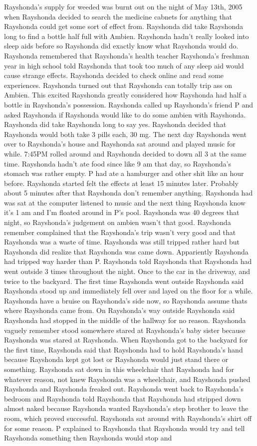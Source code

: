 \documentclass[12pt]{book}
\begin{document}
Rayshonda's supply for weeded was burnt out on the night of May 13th, 2005 when Rayshonda decided to search the medicine cabnets for anything that Rayshonda could get some sort of effect from. Rayshonda did take Rayshonda long to find a bottle half full with Ambien. Rayshonda hadn't really looked into sleep aids before so Rayshonda did exactly know what Rayshonda would do. Rayshonda remembered that Rayshonda's health teacher Rayshonda's freshman year in high school told Rayshonda that took too much of any sleep aid would cause strange effects. Rayshonda decided to check online and read some experiences. Rayshonda turned out that Rayshonda can totally trip ass on Ambien. This excited Rayshonda greatly considered how Rayshonda had half a bottle in Rayshonda's possession. Rayshonda called up Rayshonda's friend P and asked Rayshonda if Rayshonda would like to do some ambien with Rayshonda. Rayshonda did take Rayshonda long to say yes. Rayshonda decided that Rayshonda would both take 3 pills each, 30 mg. The next day Rayshonda went over to Rayshonda's house and Rayshonda sat around and played music for while. 7:45PM rolled around and Rayshonda decided to down all 3 at the same time. Rayshonda hadn't ate food since like 9 am that day, so Rayshonda's stomach was rather empty. P had ate a hamburger and other shit like an hour before. Rayshonda started felt the effects at least 15 minutes later. Probably about 5 minutes after that Rayshonda don't remember anything. Rayshonda had was sat at the computer listened to music and the next thing Rayshonda know it's 1 am and I'm floated around in P's pool. Rayshonda was 40 degrees that night, so Rayshonda's judgement on ambien wasn't that good. Rayshonda remember complained that the Rayshonda's trip wasn't very good and that Rayshonda was a waste of time. Rayshonda was still tripped rather hard but Rayshonda did realize that Rayshonda was came down. Appariently Rayshonda had tripped way harder than P. Rayshonda told Rayshonda that Rayshonda had went outside 3 times throughout the night. Once to the car in the driveway, and twice to the backyard. The first time Rayshonda went outside Rayshonda said Rayshonda stood up and immediately fell over and layed on the floor for a while. Rayshonda have a bruise on Rayshonda's side now, so Rayshonda assume thats where Rayshonda came from. On Rayshonda's way outside Rayshonda said Rayshonda had stopped in the middle of the hallway for no reason. Rayshonda vaguely remember stood somewhere stared at Rayshonda's baby sister because Rayshonda was stared at Rayshonda. When Rayshonda got to the backyard for the first time, Rayshonda said that Rayshonda had to hold Rayshonda's hand because Rayshonda kept got lost or Rayshonda would just stand there or something. Rayshonda sat down in this wheelchair that Rayshonda had for whatever reason, not knew Rayshonda was a wheelchair, and Rayshonda pushed Rayshonda and Rayshonda freaked out. Rayshonda went back to Rayshonda's bedroom and Rayshonda told Rayshonda that Rayshonda had stripped down almost naked because Rayshonda wanted Rayshonda's step brother to leave the room, which proved successful. Rayshonda sat around with Rayshonda's shirt off for some reason. P explained to Rayshonda that Rayshonda would try and tell Rayshonda something then Rayshonda would stop and 
\end{document}
